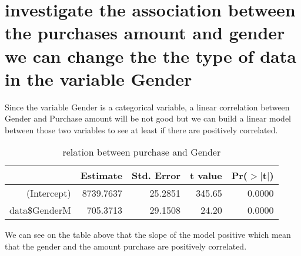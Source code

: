 \documentclass[11pt,a4paper]{article}
\begin{document}
\section{investigate the association between the purchases amount and gender we can change the the type of data in the variable Gender}
Since the variable Gender is a categorical variable, a linear correlation between Gender and Purchase amount will be not good but we can build a linear model between those two variables to see at least if there are  positively correlated.

\begin{table}[ht]
	\caption{relation between purchase and Gender}
	\centering
	\begin{tabular}{rrrrr}
		\hline 
		& Estimate & Std. Error & t value & Pr($>$$|$t$|$) \\ 
		\hline
		(Intercept) & 8739.7637 & 25.2851 & 345.65 & 0.0000 \\ 
		data\$GenderM & 705.3713 & 29.1508 & 24.20 & 0.0000 \\ 
		\hline
	\end{tabular}
\end{table}
 
 We can see on the table above that the slope of the model positive which mean that the gender and the amount purchase are positively correlated.
	
\end{document}
